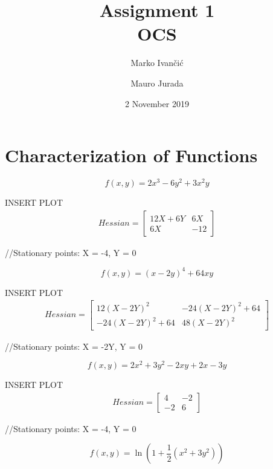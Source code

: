 \documentclass[9pt]{article}         %
\title{Assignment 1 \\ OCS}
\author{Marko Ivančić \and Mauro Jurada}
\date{2 November 2019}           %
\begin{document}
\maketitle


\section{Characterization of Functions}

\begin{equation}
	f(x,y) = 2x^3 - 6y^2 + 3x^2 y
\end{equation}

INSERT PLOT
\begin{gather}
Hessian = 
  \begin{bmatrix}
  12 X + 6Y &
   6X\\
   6X &
   -12 
   \end{bmatrix}
    \nonumber %
\end{gather}

//Stationary points: X = -4, Y = 0

\begin{equation}
	f(x,y) = (x - 2y)^4 + 64xy
\end{equation}

INSERT PLOT
\begin{gather}
Hessian = 
  \begin{bmatrix}
  12 (X - 2Y)^2 &
  -24 (X - 2Y)^2 + 64\\
  -24 (X - 2Y)^2  +64 &
  48 (X - 2Y)^2 
   \end{bmatrix}
    \nonumber
\end{gather}

//Stationary points: X = -2Y, Y = 0

\begin{equation}
	f(x,y) = 2x^2 +3y^2 - 2xy + 2x - 3y
\end{equation}

INSERT PLOT
\begin{gather}
Hessian = 
  \begin{bmatrix}
   4 &
   -2\\
   -2 &
   6 
   \end{bmatrix}
   \nonumber
\end{gather}

//Stationary points: X = -4, Y = 0

\begin{equation}
	f(x,y) = \ln(1 + \dfrac{1}{2}(x^2 +3y^2))
\end{equation}
\end{document}
